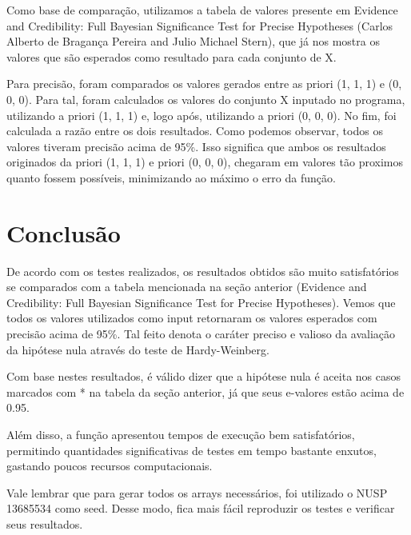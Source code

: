 \documentclass{article}
\begin{document}
        Como base de comparação, utilizamos a tabela de valores presente em Evidence and Credibility:
        Full Bayesian Significance Test for Precise Hypotheses (Carlos Alberto de Bragança Pereira and Julio Michael Stern), que já nos mostra
        os valores que são esperados como resultado para cada conjunto de X.

        Para precisão, foram comparados os valores gerados entre as priori (1, 1, 1) e (0, 0, 0). Para tal, foram calculados os valores
        do conjunto X inputado no programa, utilizando a priori (1, 1, 1) e, logo após, utilizando a priori (0, 0, 0). No fim, foi calculada
        a razão entre os dois resultados. Como podemos observar, todos os valores tiveram precisão acima de 95\%. Isso significa que ambos os
        resultados originados da priori (1, 1, 1) e priori (0, 0, 0), chegaram em valores tão proximos quanto fossem possíveis,
        minimizando ao máximo o erro da função.


        \section{Conclusão}

        De acordo com os testes realizados, os resultados obtidos são muito satisfatórios se comparados
        com a tabela mencionada na seção anterior (Evidence and Credibility: Full Bayesian Significance Test for Precise Hypotheses).
        Vemos que todos os valores utilizados como input retornaram os valores esperados com precisão acima de 95\%.
        Tal feito denota o caráter preciso e valioso da avaliação da hipótese nula através do teste de Hardy-Weinberg.

        Com base nestes resultados, é válido dizer que a hipótese nula é aceita nos casos marcados com * na tabela da seção anterior,
        já que seus e-valores estão acima de 0.95.

        Além disso, a função apresentou tempos de execução bem satisfatórios, permitindo quantidades significativas de testes
        em tempo bastante enxutos, gastando poucos recursos computacionais.

        Vale lembrar que para gerar todos os arrays necessários, foi utilizado o NUSP
        13685534 como seed. Desse modo, fica mais fácil reproduzir os testes e verificar
        seus resultados.
\end{document}
